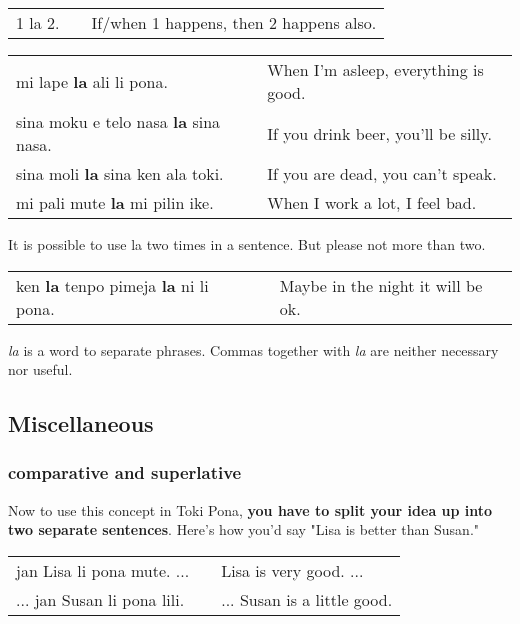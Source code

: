 \begin{supertabular}{p{5,5cm}|ll}
1 la 2. && If/when 1 happens, then 2 happens also. \\  %
\end{supertabular} 

\begin{supertabular}{p{5,5cm}|ll}
mi lape \textbf{la} ali li pona. && When I'm asleep, everything is good. \\
sina moku e telo nasa \textbf{la} sina nasa. && If you drink beer, you'll be silly. \\
sina moli \textbf{la} sina ken ala toki. && If you are dead, you can't speak. \\
mi pali mute \textbf{la} mi pilin ike. && When I work a lot, I feel bad. \\
\end{supertabular} 

It is possible to use la two times in a sentence. But please not more than two. 

\begin{supertabular}{p{5,5cm}|ll}
ken \textbf{la} tenpo pimeja \textbf{la} ni li pona. && Maybe in the night it will be ok. \\  
\end{supertabular} 

\textit{la} is a word to separate phrases. Commas together with \textit{la} are neither necessary nor useful. 

%
\subsection*{Miscellaneous}
\subsubsection*{comparative and superlative} 
%
Now to use this concept in Toki Pona, \textbf{you have to split your idea up into two separate sentences}. 
Here's how you'd say "Lisa is better than Susan."

\begin{supertabular}{p{5,5cm}|ll}
jan Lisa li pona mute. ...  && Lisa is very good. ... \\ %
... jan Susan li pona lili. && ... Susan is a little good. \\ %
\end{supertabular} 

